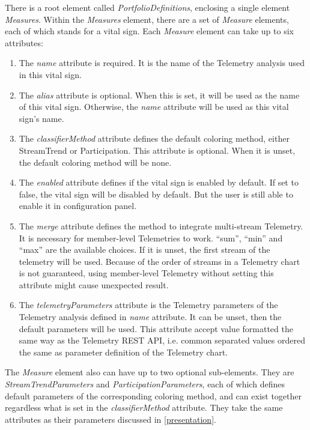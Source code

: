 There is a root element called {\it PortfolioDefinitions}, enclosing a single element {\it Measures}. Within the {\it Measures} element, there are a set of {\it Measure} elements, each of which stands for a vital sign. Each {\it Measure} element can take up to six attributes:
\begin{enumerate}
\item The {\it name} attribute is required. It is the name of the Telemetry analysis used in this vital sign.
\item The {\it alias} attribute is optional. When this is set, it will be used as the name of this vital sign. Otherwise, the {\it name} attribute will be used as this vital sign's name.
\item The {\it classifierMethod} attribute defines the default coloring method, either StreamTrend or Participation. This attribute is optional. When it is unset, the default coloring method will be none.
\item The {\it enabled} attribute defines if the vital sign is enabled by default. If set to false, the vital sign will be disabled by default. But the user is still able to enable it in configuration panel.
\item The {\it merge} attribute defines the method to integrate multi-stream Telemetry. It is necessary for member-level Telemetries to work. ``sum'', ``min'' and ``max'' are the available choices. If it is unset, the first stream of the telemetry will be used. Because of the order of streams in a Telemetry chart is not guaranteed, using member-level Telemetry without setting this attribute might cause unexpected result.
\item The {\it telemetryParameters} attribute is the Telemetry parameters of the Telemetry analysis defined in {\it name} attribute. It can be unset, then the default parameters will be used. This attribute accept value formatted the same way as the Telemetry REST API, i.e. common separated values ordered the same as parameter definition of the Telemetry chart.
\end{enumerate}

The {\it Measure} element also can have up to two optional sub-elements. They are {\it StreamTrendParameters} and {\it ParticipationParameters}, each of which defines default parameters of the corresponding coloring method, and can exist together regardless what is set in the {\it classifierMethod} attribute. They take the same attributes as their parameters discussed in \autoref{presentation}.


